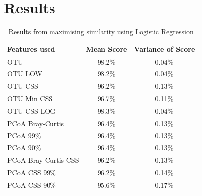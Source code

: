 \chapter{Results}

\ifpdf
    \graphicspath{{Chapter3/Figs/Raster/}{Chapter3/Figs/PDF/}{Chapter3/Figs/}}
\else
    \graphicspath{{Chapter3/Figs/Vector/}{Chapter3/Figs/}}
\fi
\begin{table}
\caption{Results from maximising similarity using Logistic Regression}
\centering
\label{table:lrsimilarity}
\begin{tabular}{l c  c}
\hline 
Features used & Mean Score & Variance of Score \\ 
 
\hline
OTU & 98.2\% & 0.04\%   \\
OTU LOW &98.2\% &0.04\%\\
OTU CSS & 96.2\% & 0.13\%   \\
OTU Min CSS & 96.7\% & 0.11\%   \\
OTU CSS LOG & 98.3\% & 0.04\% \\
PCoA Bray-Curtis &96.4\% & 0.13\%   \\
PCoA 99\%      &  96.4\%& 0.13\%\\
PCoA 90\%       & 96.4\% &0.13\%\\
PCoA Bray-Curtis CSS &96.2\% & 0.13\%   \\
PCoA CSS 99\%    &96.2\%&0.14\%\\
PCoA CSS 90\%  &  95.6\% &0.17\%\\
\hline 
\end{tabular}
\end{table}
